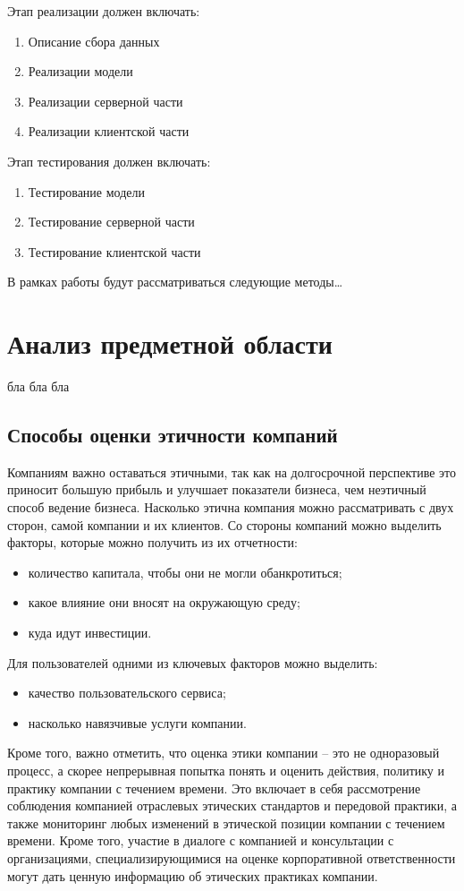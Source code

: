 \documentclass[PI, VKR]{HSEUniversity}
\begin{document}
Этап реализации должен включать:
\begin{enumerate}
\item Описание сбора данных
\item Реализации модели
\item Реализации серверной части
\item Реализации клиентской части
\end{enumerate}

Этап тестирования должен включать:
\begin{enumerate}
\item Тестирование модели
\item Тестирование серверной части
\item Тестирование клиентской части
\end{enumerate}
В рамках работы будут рассматриваться следующие методы\ldots{}
\chapter{Анализ предметной области}
\label{sec:orgdf880f5}
бла бла бла
\section{Способы оценки этичности компаний}
\label{sec:orgf1d8e74}
Компаниям важно оставаться этичными, так как на долгосрочной перспективе это приносит большую прибыль и улучшает показатели бизнеса, чем неэтичный способ ведение бизнеса\autocites{climent_ethical_2018}[][]{mure_esg_2021}. Насколько этична компания можно рассматривать с двух сторон, самой компании и их клиентов. Со стороны компаний можно выделить факторы, которые можно получить из их отчетности:
\begin{itemize}
\item количество капитала, чтобы они не могли обанкротиться;
\item какое влияние они вносят на окружающую среду;
\item куда идут инвестиции\autocite{harvey_ethical_1995}.
\end{itemize}
Для пользователей одними из ключевых факторов можно выделить:
\begin{itemize}
\item качество пользовательского сервиса\autocite{brunk_exploring_2010};
\item насколько навязчивые услуги компании\autocite{mitchell_bank_1992}.
\end{itemize}

Кроме того, важно отметить, что оценка этики компании -- это не одноразовый процесс, а скорее непрерывная попытка понять и оценить действия, политику и практику компании с течением времени. Это включает в себя рассмотрение соблюдения компанией отраслевых этических стандартов и передовой практики, а также мониторинг любых изменений в этической позиции компании с течением времени. Кроме того, участие в диалоге с компанией и консультации с организациями, специализирующимися на оценке корпоративной ответственности могут дать ценную информацию об этических практиках компании.
\end{document}
